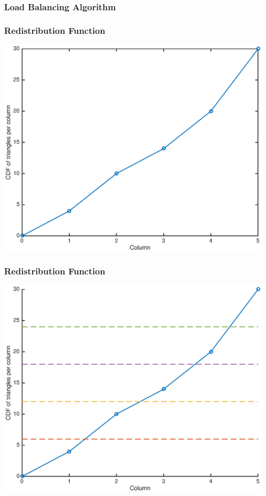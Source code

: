 \documentclass[]{beamer}
\begin{document}
\begin{frame}[t]\frametitle{Load Balancing Algorithm}
\vspace{-0.5 cm}
\begin{block}{}

\end{block}
\end{frame}

\begin{frame}[t]\frametitle{Redistribution Function}
\centering
\includegraphics[scale = 0.5]{figures/before_redistribute.eps}
\end{frame}

\begin{frame}[t]\frametitle{Redistribution Function}
\centering
\includegraphics[scale = 0.5]{figures/after_redistribute.eps}
\end{frame}
\end{document}
